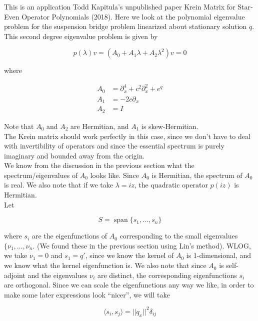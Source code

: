 \documentclass[12pt]{article}
\DeclareMathOperator{\spn}{span}
\begin{document}
This is an application Todd Kapitula's unpublished paper Krein Matrix for Star-Even Operator Polynomials (2018). Here we look at the polynomial eigenvalue problem for the suspension bridge problem linearized about stationary solution $q$. This second degree eigenvalue problem is given by

\begin{equation}
p(\lambda)v = (A_0 + A_1 \lambda + A_2 \lambda^2 )v = 0
\end{equation}

where

\begin{align*}
A_0 &= \partial_x^4 + c^2 \partial_x^2 + e^{q} \\
A_1 &= - 2 c \partial_x \\
A_2 &= I 
\end{align*}

Note that $A_0$ and $A_2$ are Hermitian, and $A_1$ is skew-Hermitian.\\

The Krein matrix should work perfectly in this case, since we don't have to deal with invertibility of operators and since the essential spectrum is purely imaginary and bounded away from the origin.\\

We know from the discussion in the previous section what the spectrum/eigenvalues of $A_0$ looks like. Since $A_0$ is Hermitian, the spectrum of $A_0$ is real. We also note that if we take $\lambda = i z$, the quadratic operator $p(iz)$ is Hermitian.
\\


Let

\begin{equation}\label{defS}
S = \spn\{s_1, \dots, s_n \}
\end{equation}

where $s_i$ are the eigenfunctions of $A_0$ corresponding to the small eigenvalues $\{\nu_1, \dots, \nu_n$. (We found these in the previous section using Lin's method). WLOG, we take $\nu_1 = 0$ and $s_1 = q'$, since we know the kernel of $A_0$ is 1-dimensional, and we know what the kernel eigenfunction is. We also note that since $A_0$ is self-adjoint and the eigenvalues $\nu_i$ are distinct, the corresponding eigenfunctions $s_i$ are orthogonal. Since we can scale the eigenfunctions any way we like, in order to make some later expressions look ``nicer'', we will take

\begin{equation}\label{orthonormaleigs}
\langle s_i, s_j \rangle = ||q_x||^2 \delta_{ij}
\end{equation}
\end{document}
